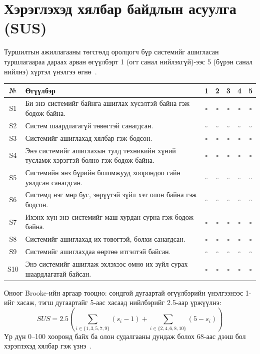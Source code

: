 
\chapter{Хэрэглэхэд хялбар байдлын асуулга (SUS)}
\label{AppendixB}
Туршилтын ажиллагааны төгсгөлд оролцогч бүр системийг ашигласан туршлагаараа дараах арван өгүүлбэрт 1 (огт санал нийлэхгүй)-ээс 5 (бүрэн санал нийлнэ) хүртэл үнэлгээ өгнө~\cite{brooke}.

\begin{longtable}{|c|p{9.6cm}|c|c|c|c|c|}
\hline
\textbf{№} & \textbf{Өгүүлбэр} & \textbf{1} & \textbf{2} & \textbf{3} & \textbf{4} & \textbf{5} \\ \hline
S1 & Би энэ системийг байнга ашиглах хүсэлтэй байна гэж бодож байна. & $\square$ & $\square$ & $\square$ & $\square$ & $\square$ \\ \hline
S2 & Систем шаардлагагүй төвөгтэй санагдсан. & $\square$ & $\square$ & $\square$ & $\square$ & $\square$ \\ \hline
S3 & Системийг ашиглахад хялбар гэж бодсон. & $\square$ & $\square$ & $\square$ & $\square$ & $\square$ \\ \hline
S4 & Энэ системийг ашиглахын тулд техникийн хүний тусламж хэрэгтэй болно гэж бодож байна. & $\square$ & $\square$ & $\square$ & $\square$ & $\square$ \\ \hline
S5 & Системийн янз бүрийн боломжууд хоорондоо сайн уялдсан санагдсан. & $\square$ & $\square$ & $\square$ & $\square$ & $\square$ \\ \hline
S6 & Системд нэг мөр бус, зөрүүтэй зүйл хэт олон байна гэж бодсон. & $\square$ & $\square$ & $\square$ & $\square$ & $\square$ \\ \hline
S7 & Ихэнх хүн энэ системийг маш хурдан сурна гэж бодож байна. & $\square$ & $\square$ & $\square$ & $\square$ & $\square$ \\ \hline
S8 & Системийг ашиглахад их төвөгтэй, болхи санагдсан. & $\square$ & $\square$ & $\square$ & $\square$ & $\square$ \\ \hline
S9 & Системийг ашиглахдаа өөртөө итгэлтэй байсан. & $\square$ & $\square$ & $\square$ & $\square$ & $\square$ \\ \hline
S10 & Энэ системийг ашиглаж эхлэхээс өмнө их зүйл сурах шаардлагатай байсан. & $\square$ & $\square$ & $\square$ & $\square$ & $\square$ \\ \hline
\end{longtable}

Оноог Brooke-ийн аргаар тооцно: сондгой дугаартай өгүүлбэрийн үнэлгээнээс 1-ийг хасаж, тэгш дугаартайг 5-аас хасаад нийлбэрийг 2.5-аар үржүүлнэ:
\begin{equation}
SUS = 2.5\left(\sum_{i\in\{1,3,5,7,9\}} (s_i - 1) + \sum_{i\in\{2,4,6,8,10\}} (5 - s_i)\right)
\end{equation}
Үр дүн 0--100 хооронд байх ба олон судалгааны дундаж болох 68-аас дээш бол хэрэглэхэд хялбар гэж үзнэ~\cite{bangor}.
